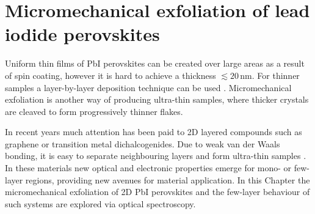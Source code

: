 
\chapter{Micromechanical exfoliation of lead iodide perovskites}

\graphicspath{{Chapter5/Figures/}}


Uniform thin films of PbI perovskites can be created over large areas as a result of spin coating, however it is hard to achieve a thickness $\lesssim20$\,nm. For thinner samples a layer-by-layer deposition technique can be used \cite{Era2000, Matsui2002}. Micromechanical exfoliation is another way of producing ultra-thin samples, where thicker crystals are cleaved to form progressively thinner flakes.

In recent years much attention has been paid to 2D layered compounds such as graphene or transition metal dichalcogenides. Due to weak van der Waals bonding, it is easy to separate neighbouring layers and form ultra-thin samples \cite{Novoselov2004, Blake2007, Ni2007, Splendiani2010, Castellanos-Gomez2010, Tonndorf2013}. In these materials new optical and electronic properties emerge for mono- or few-layer regions, providing new avenues for material application. In this Chapter the micromechanical exfoliation of 2D PbI perovskites and the few-layer behaviour of such systems are explored via optical spectroscopy.

